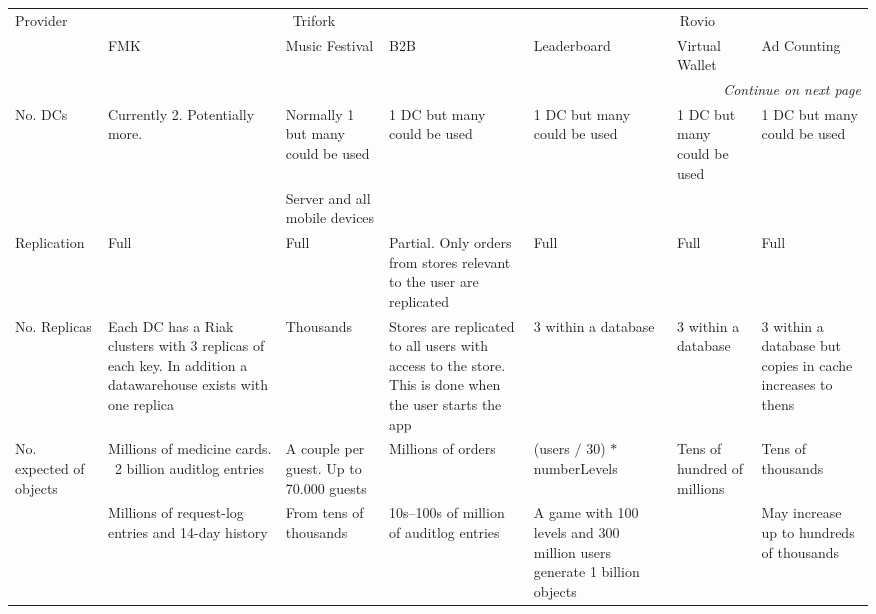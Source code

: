 \begin{landscape}
	\small  %
	\begin{center}
		 \begin{longtable}{|p{2.2cm}||p{3.6cm}|p{3.4cm}|p{3.4cm}||p{3.8cm}|p{3.4cm}|p{3.1cm}|}
			\hline
			Provider & 
				\multicolumn{3}{c|}{Trifork} & 
				\multicolumn{3}{c|}{Rovio} \\ \cline{2-7}

			     & 
				FMK & 
				Music Festival & 
				B2B & 
				Leaderboard & 
				Virtual Wallet & 
				Ad Counting \\
			\hline
			\hline
			\endhead
			\hline \multicolumn{7}{r}{\textit{Continue on next page}} \\
			\endfoot
			\endlastfoot

			No. DCs	& 
				Currently 2. Potentially more.	& 
				Normally 1 but many could be used & 
				1 DC but many could be used & 
				1 DC but many could be used & 
				1 DC but many could be used	& 
				1 DC but many could be used \\\cline{3-3}
	
			       & 
			       & 
			     Server and all mobile devices  & 
			       & 
			       &  
			       & \\
			\hline
	
			Replication & 
				Full & 
				Full & 
				Partial. Only orders from stores relevant to the user are replicated & 
				Full & 
				Full & 
				Full \\
			\hline
	
			No. Replicas & 
				Each DC has a Riak clusters with 3 replicas of each key. In addition a datawarehouse exists with one replica & 
				Thousands & 
				Stores are replicated to all users with access to the store. This is done when the user starts the app & 
				3 within a database	& 
				3 within a database	& 
				3 within a database but copies in cache increases to thens \\
			\hline
	
			No. expected of objects & 
				Millions of medicine cards. ~2 billion auditlog entries & 
				A couple per guest. Up to 70.000 guests & 
				Millions of orders & 
				(users $/$ 30) $*$ numberLevels & 
				Tens of hundred of millions &
				Tens of thousands \\ \cline{2-5} \cline{7-7}
			
				 & 
				Millions of request-log entries and 14-day history & 
				From tens of thousands & 
				10s--100s of million of auditlog entries & 
				A game with 100 levels and 300 million users generate 1 billion objects & 
				 & 
				May increase up to hundreds of thousands \\ \cline{2-3} \cline{4-5} \cline{7-7}
	

\end{longtable}
\end{center}
\end{landscape}
